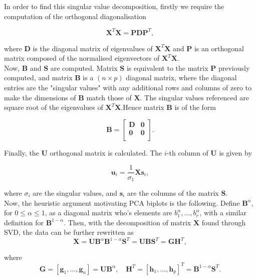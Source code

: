 \documentclass{article}\usepackage[]{graphicx}\usepackage[]{xcolor}
\numberwithin{equation}{section}
\begin{document}
{\noindent In order to find this singular value decomposition, firstly we require the computation of the orthogonal diagonalisation  

\[
\mathbf{X}^T\mathbf{X}=\mathbf{PDP}^T,
\] 

\noindent where $\mathbf{D}$ is the diagonal matrix of eigenvalues of $\mathbf{X}^T\mathbf{X}$ and $\mathbf{P}$ is an orthogonal matrix composed of the normalised eigenvectors of $\mathbf{X}^T\mathbf{X}$.\\

\noindent Now, $\mathbf{B}$ and $\mathbf{S}$ are computed. Matrix $\mathbf{S}$ is equivalent to the matrix $\mathbf{P}$ previously computed, and matrix $\mathbf{B}$ is a $(n \times p)$ diagonal matrix, where the diagonal entries are the "singular values" with any additional rows and columns of zero to make the dimensions of $\mathbf{B}$ match those of $\mathbf{X}$. The singular values referenced are square root of the eigenvalues of $\mathbf{X}^T\mathbf{X}$.Hence matrix $\mathbf{B}$ is of the form

\[
\mathbf{B} = 
\begin{bmatrix}
    \mathbf{D} & \mathbf{0} \\
    \mathbf{0} & \mathbf{0} \\
\end{bmatrix}.
\]

\noindent Finally, the $\mathbf{U}$ orthogonal matrix is calculated. The $i$-th column of $\mathbf{U}$ is given by

\[
\mathbf{u}_i = \frac{1}{\sigma_1}\mathbf{X}\mathbf{s}_i,
\]

\noindent where $\sigma_i$ are the singular values, and $\mathbf{s}_i$ are the columns of the matrix $\mathbf{S}$.\\


\noindent Now, the heuristic argument motivating PCA biplots is the following. Define $\mathbf{B}^{\alpha}$, for $0 \leq \alpha \leq 1$, as a diagonal matrix who's elements are $b_1^{\alpha}, \ldots, b_r^{\alpha}$, with a similar definition for $\mathbf{B}^{1-\alpha}.$ Then, with the decomposition of matrix $\mathbf{X}$ found through SVD, the data can be further rewritten as
\[\mathbf{X} = \mathbf{U}\mathbf{B}^{\alpha}\mathbf{B}^{1-\alpha}\mathbf{S}^{T} = \mathbf{U}\mathbf{B}\mathbf{S}^{T} = \mathbf{G}\mathbf{H}^{T},\]

\noindent where \[\mathbf{G} = [\mathbf{g}_1, \dots , \mathbf{g}_n] = \mathbf{U}\mathbf{B}^\alpha, \quad \mathbf{H}^T = [\mathbf{h}_1, \dots , \mathbf{h}_p]^T = \mathbf{B}^{1-\alpha}\mathbf{S}^T. \]

}
\end{document}
